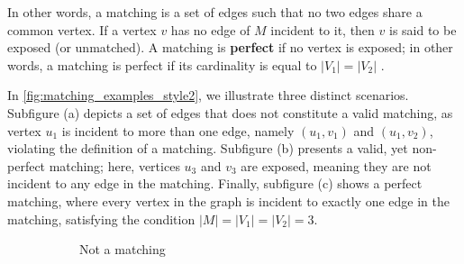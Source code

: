 In other words, a matching is a set of edges such that no two edges share a common vertex. If a vertex $v$ has no edge of $M$ incident to it, then $v$ is said to be exposed (or unmatched). A matching is \textbf{perfect} if no vertex is exposed; in other words, a matching is perfect if its cardinality is equal to $|V_1| = |V_2|$ \cite{goemans2009matching}.

\begin{example}
    In \cref{fig:matching_examples_style2}, we illustrate three distinct scenarios. Subfigure (a) depicts a set of edges that does not constitute a valid matching, as vertex $u_1$ is incident to more than one edge, namely $(u_1, v_1)$ and $(u_1, v_2)$, violating the definition of a matching. Subfigure (b) presents a valid, yet non-perfect matching; here, vertices $u_3$ and $v_3$ are exposed, meaning they are not incident to any edge in the matching. Finally, subfigure (c) shows a perfect matching, where every vertex in the graph is incident to exactly one edge in the matching, satisfying the condition $|M| = |V_1| = |V_2| = 3$.
    \begin{figure}[H]
        \centering
        \begin{subfigure}[b]{0.3\textwidth}
            \centering
            \caption{Not a matching}
            \label{fig:not_a_matching_style2}
        \end{subfigure}
        \hfill
        \begin{subfigure}[b]{0.3\textwidth}
            \centering
\end{subfigure}
\end{figure}
\end{example}
